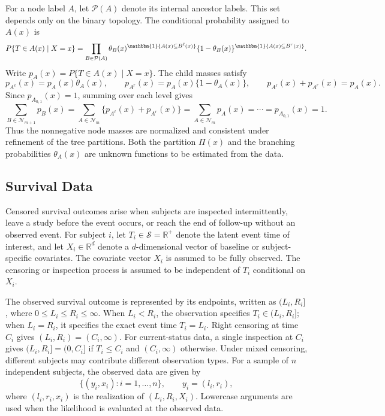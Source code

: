 \documentclass[11pt]{article}
\numberwithin{equation}{section}
\begin{document}
For a node label $A$, let $\mathcal P(A)$ denote its internal ancestor labels. This set depends only on the binary topology. The conditional probability assigned to $A(x)$ is
\begin{equation}
    P\{T\in A(x)\mid X=x\}
    =
    \prod_{B\in\mathcal P(A)}
    \theta_B(x)^{\mathbbm{1}\{A(x)\subseteq B^\ell(x)\}}
    \{1-\theta_B(x)\}^{\mathbbm{1}\{A(x)\subseteq B^r(x)\}} .
    \label{eq:deterministic-response-tree-mass}
\end{equation}
Write $p_A(x)=P\{T\in A(x)\mid X=x\}$. The child masses satisfy
\[
    p_{A^\ell}(x)=p_A(x)\theta_A(x),\qquad
    p_{A^r}(x)=p_A(x)\{1-\theta_A(x)\},\qquad
    p_{A^\ell}(x)+p_{A^r}(x)=p_A(x).
\]
Since $p_{A_{0,1}}(x)=1$, summing over each level gives
\[
    \sum_{B\in\mathcal N_{m+1}}p_B(x)
    =\sum_{A\in\mathcal N_m}\{p_{A^\ell}(x)+p_{A^r}(x)\}
    =\sum_{A\in\mathcal N_m}p_A(x)
    =\cdots=p_{A_{0,1}}(x)=1.
\]
Thus the nonnegative node masses are normalized and consistent under refinement of the tree partitions. Both the partition $\Pi(x)$ and the branching probabilities $\theta_A(x)$ are unknown functions to be estimated from the data.

\subsection{Survival Data}
Censored survival outcomes arise when subjects are inspected intermittently, leave a study before the event occurs, or reach the end of follow-up without an observed event. For subject $i$, let $T_i \in \mathcal{S}=\mathbb{R}^{+}$ denote the latent event time of interest, and let $X_i \in \mathbb{R}^{d}$ denote a $d$-dimensional vector of baseline or subject-specific covariates. The covariate vector $X_i$ is assumed to be fully observed. The censoring or inspection process is assumed to be independent of $T_i$ conditional on $X_i$.

The observed survival outcome is represented by its endpoints, written as $(L_i,R_i]$, where $0\leq L_i\leq R_i\leq\infty$. When $L_i<R_i$, the observation specifies $T_i\in(L_i,R_i]$; when $L_i=R_i$, it specifies the exact event time $T_i=L_i$. Right censoring at time $C_i$ gives $(L_i,R_i)=(C_i,\infty)$. For current-status data, a single inspection at $C_i$ gives $(L_i,R_i]=(0,C_i]$ if $T_i\leq C_i$ and $(C_i,\infty)$ otherwise. Under mixed censoring, different subjects may contribute different observation types.
For a sample of $n$ independent subjects, the observed data are given by
$$
    \{(y_i,x_i): i=1,\ldots,n\},
    \qquad
    y_i=(l_i,r_i),
$$
where $(l_i,r_i,x_i)$ is the realization of $(L_i,R_i,X_i)$. Lowercase arguments are used when the likelihood is evaluated at the observed data.
\end{document}
